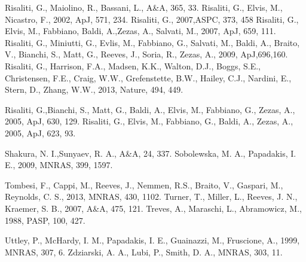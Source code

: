 \documentclass[useAMS,usenatbib]{sam}
\begin{document}
\begin{thebibliography}{99}
     Risaliti, G., Maiolino, R., Bassani, L., A\&A, 365, 33.
     Risaliti, G., Elvis, M., Nicastro, F., 2002, ApJ, 571, 234.
     Risaliti, G., 2007,ASPC, 373, 458
     Risaliti, G., Elvis, M., Fabbiano, Baldi, A.,Zezas, A., Salvati, M., 2007, ApJ, 659, 111.
     Risaliti, G., Miniutti, G., Evlis, M., Fabbiano, G., Salvati, M., Baldi, A., Braito, V., 
									 Bianchi, S., Matt, G., Reeves, J., Soria, R., Zezas, A., 2009, ApJ,696,160.     
     Risaliti, G., Harrison, F.A., Madsen, K.K., Walton, D.J., Boggs, S.E., Christensen,  F.E., 
							Craig, W.W., Grefenstette, B.W., Hailey, C.J., Nardini, E., Stern, D., Zhang, W.W., 2013, Nature, 494, 449. 

     Risaliti, G.,Bianchi, S., Matt, G., Baldi, A., Elvis, M., Fabbiano, G., Zezas, A., 2005, ApJ,
630, 129.
     Risaliti, G., Elvis, M., Fabbiano, G., Baldi, A., Zezas, A., 2005, ApJ, 623, 93.
    
     Shakura, N. I.,Sunyaev, R. A., A\&A, 24, 337.
     Sobolewska, M. A., Papadakis, I. E., 2009, MNRAS, 399, 1597.

     Tombesi, F., Cappi, M., Reeves, J., Nemmen, R.S., Braito, V., Gaspari, M., Reynolds, C. S., 2013,
MNRAS, 430, 1102.
     Turner, T., Miller, L., Reeves, J. N., Kraemer, S. B., 2007, A\&A, 475, 121.
     Treves, A., Maraschi, L., Abramowicz, M., 1988, PASP, 100, 427.
    
     Uttley, P., McHardy, I. M., Papadakis, I. E., Guainazzi, M., Fruscione, A., 1999, MNRAS, 307, 6.
     Zdziarski, A. A., Lubi, P., Smith, D. A., MNRAS, 303, 11.
    
\end{thebibliography}

\label{lastpage}
\end{document}
